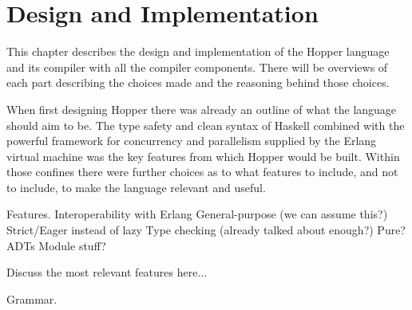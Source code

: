 \chapter{Design and Implementation}


This chapter describes the design and implementation of the Hopper language and its compiler with all the compiler components. There will be overviews of each part describing the choices made and the reasoning behind those choices.


When first designing Hopper there was already an outline of what the language should aim to be. The type safety and clean syntax of Haskell combined with the powerful framework for concurrency and parallelism supplied by the Erlang virtual machine was the key features from which Hopper would be built. Within those confines there were further choices as to what features to include, and not to include, to make the language relevant and useful.


Features.
Interoperability with Erlang
General-purpose (we can assume this?)
Strict/Eager instead of lazy
Type checking (already talked about enough?)
Pure?
ADTs
Module stuff?


Discuss the most relevant features here...

Grammar.



%






